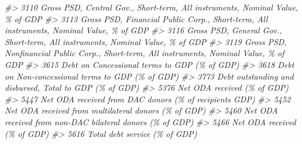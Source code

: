\documentclass[
]{bxjsbook}
\newenvironment{Shaded}{\begin{snugshade}}{\end{snugshade}}
\newcommand{\CommentTok}[1]{\textcolor[rgb]{0.56,0.35,0.01}{\textit{#1}}}
\theoremstyle{definition}
\theoremstyle{definition}
\theoremstyle{definition}
\theoremstyle{definition}
\theoremstyle{remark}
\begin{document}
\begin{Shaded}
\begin{Highlighting}[]
\CommentTok{\#\textgreater{} 3110                                                                                              Gross PSD, Central Gov., Short{-}term, All instruments, Nominal Value, \% of GDP}
\CommentTok{\#\textgreater{} 3113                                                                                    Gross PSD, Financial Public Corp., Short{-}term, All instruments, Nominal Value, \% of GDP}
\CommentTok{\#\textgreater{} 3116                                                                                              Gross PSD, General Gov., Short{-}term, All instruments, Nominal Value, \% of GDP}
\CommentTok{\#\textgreater{} 3119                                                                                 Gross PSD, Nonfinancial Public Corp., Short{-}term, All instruments, Nominal Value, \% of GDP}
\CommentTok{\#\textgreater{} 3615                                                                                                                               Debt on Concessional terms to GDP (\% of GDP)}
\CommentTok{\#\textgreater{} 3618                                                                                                                           Debt on Non{-}concessional terms to GDP (\% of GDP)}
\CommentTok{\#\textgreater{} 3773                                                                                                                    Debt outstanding and disbursed, Total to GDP (\% of GDP)}
\CommentTok{\#\textgreater{} 5376                                                                                                                                                Net ODA received (\% of GDP)}
\CommentTok{\#\textgreater{} 5447                                                                                                                    Net ODA received from DAC donors (\% of recipient\textquotesingle{}s GDP)}
\CommentTok{\#\textgreater{} 5452                                                                                                                       Net ODA received from multilateral donors (\% of GDP)}
\CommentTok{\#\textgreater{} 5460                                                                                                                  Net ODA received from non{-}DAC bilateral donors (\% of GDP)}
\CommentTok{\#\textgreater{} 5466                                                                                                                                                Net ODA received (\% of GDP)}
\CommentTok{\#\textgreater{} 5616                                                                                                                                              Total debt service (\% of GDP)}

\end{Highlighting}
\end{Shaded}
\end{document}
